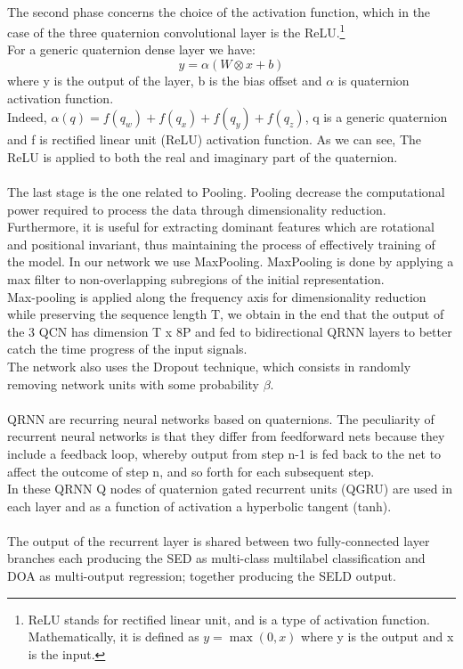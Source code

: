 \documentclass{article}
\begin{document}
    \\ The second phase concerns the choice of the activation function, which in the case of the three quaternion convolutional layer 
    is the ReLU.\footnote{ReLU stands for rectified linear unit, and is a type of activation function. Mathematically, it is defined 
    as $y = \max(0, x)$ where y is the output and x is the input.}
    \\ For a generic quaternion dense layer we have:
    \begin{equation*}
        y = \alpha( W \otimes x + b)
    \end{equation*}
    where  y is the output of the layer, b is the bias offset and $\alpha$ is quaternion activation function.
    \\ Indeed,  $\alpha(q) = f(q_w) + f(q_x) + f(q_y) + f(q_z)$, q is a generic quaternion and f is rectified linear unit (ReLU) 
    activation function. As we can see, The ReLU is applied to both the real and imaginary part of the quaternion.
    \\ \\ The last stage is the one related to Pooling. Pooling decrease the computational power required to process the data through 
    dimensionality reduction. Furthermore, it is useful for extracting dominant features which are rotational and positional invariant,
    thus maintaining the process of effectively training of the model. In our network we use MaxPooling.
    MaxPooling is done by applying a max filter to non-overlapping subregions of the initial representation.
    \\ Max-pooling is applied along the frequency axis for 
    dimensionality reduction while preserving the sequence length T, we obtain in the end that the output of the 3 QCN has 
    dimension T x 8P and fed to bidirectional QRNN layers to better catch the time progress of the input signals.  
    \\ The network also uses the Dropout technique, which consists in randomly removing network units with some probability $\beta$.
    \\ \\ QRNN are recurring neural networks based on quaternions.
    The peculiarity of recurrent neural networks is that they differ from feedforward nets because they include a feedback loop,
    whereby output from step n-1 is fed back to the net to affect the outcome of step n, and so forth for each subsequent step.
    \\ In these QRNN Q nodes of quaternion gated recurrent units (QGRU) are used in each layer and as a function of activation
    a hyperbolic tangent (tanh).
    \\ \\ The output of the recurrent layer is shared between two fully-connected layer branches each producing the SED as 
    multi-class multilabel classification and DOA as multi-output regression; together producing the SELD output.
\end{document}
